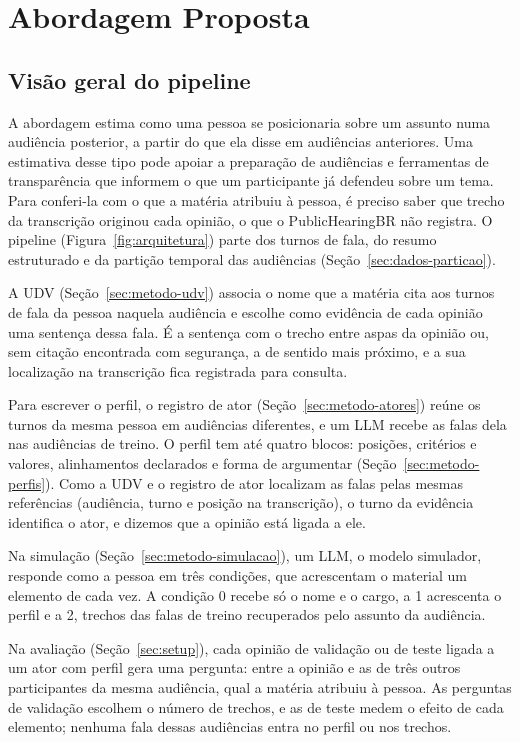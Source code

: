 \section{Abordagem Proposta}
\label{sec:metodo}

\subsection{Visão geral do pipeline}
\label{sec:metodo-visao}



A abordagem estima como uma pessoa se posicionaria sobre um assunto numa audiência posterior, a
partir do que ela disse em audiências anteriores. Uma estimativa
desse tipo pode apoiar a preparação de audiências e ferramentas de transparência que informem o que
um participante já defendeu sobre um tema. Para conferi-la com o que a matéria atribuiu à pessoa, é
preciso saber que trecho da transcrição originou cada opinião, o que o PublicHearingBR não registra.
O pipeline (Figura~\ref{fig:arquitetura}) parte dos turnos de fala, do resumo estruturado e da
partição temporal das audiências (Seção~\ref{sec:dados-particao}).

A UDV (Seção~\ref{sec:metodo-udv}) associa o nome que a matéria cita aos turnos de fala da pessoa
naquela audiência e escolhe como evidência de cada opinião uma sentença dessa fala. É a sentença com
o trecho entre aspas da opinião ou, sem citação encontrada com segurança, a de sentido mais próximo, e
a sua localização na transcrição fica registrada para consulta.

Para escrever o perfil, o registro de ator (Seção~\ref{sec:metodo-atores}) reúne os turnos da mesma
pessoa em audiências diferentes, e um LLM recebe as falas dela nas audiências de treino. O perfil tem
até quatro blocos: posições, critérios e valores, alinhamentos declarados e forma de argumentar
(Seção~\ref{sec:metodo-perfis}). Como a UDV e o registro de ator localizam as falas pelas mesmas
referências (audiência, turno e posição na transcrição), o turno da evidência identifica o ator, e
dizemos que a opinião está ligada a ele.

Na simulação (Seção~\ref{sec:metodo-simulacao}), um LLM, o modelo simulador, responde como a pessoa
em três condições, que acrescentam o material um elemento de cada vez. A condição 0 recebe só o
nome e o cargo, a 1 acrescenta o perfil e a 2, trechos das falas de treino recuperados pelo assunto
da audiência.

Na avaliação (Seção~\ref{sec:setup}), cada opinião de validação ou de teste ligada a um ator com
perfil gera uma pergunta: entre a opinião e as de três outros participantes da mesma audiência, qual
a matéria atribuiu à pessoa. As perguntas de validação escolhem o número de trechos, e as de teste
medem o efeito de cada elemento; nenhuma fala dessas audiências entra no perfil ou nos trechos.


